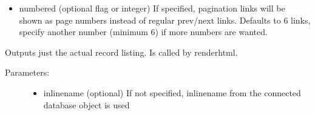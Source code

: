 \documentclass[letterpaper,10pt,english]{sphinxmanual}
\begin{document}
\begin{fulllineitems}
\begin{fulllineitems}
\begin{description}
\begin{itemize}
\item {} 
numbered (optional flag or integer)
If specified, pagination links will be shown as page numbers instead of
regular prev/next links. Defaults to 6 links, specify another number
(minimum 6) if more numbers are wanted.

\end{itemize}

\end{description}

\end{fulllineitems}


\begin{fulllineitems}
\label{knop_grid:knop_grid.renderlisting}
Outputs just the actual record listing. Is called by renderhtml.
\begin{description}
\item[{Parameters:}] \leavevmode\begin{itemize}
\item {} 
inlinename (optional)
If not specified, inlinename from the connected database object is used

\end{itemize}

\end{description}

\end{fulllineitems}


\begin{fulllineitems}
\label{knop_grid:knop_grid.rowsorting}
\end{fulllineitems}



\begin{fulllineitems}
\end{fulllineitems}


\begin{fulllineitems}
\label{knop_grid:knop_grid.sortdescending}
\end{fulllineitems}




\end{fulllineitems}
\end{document}
